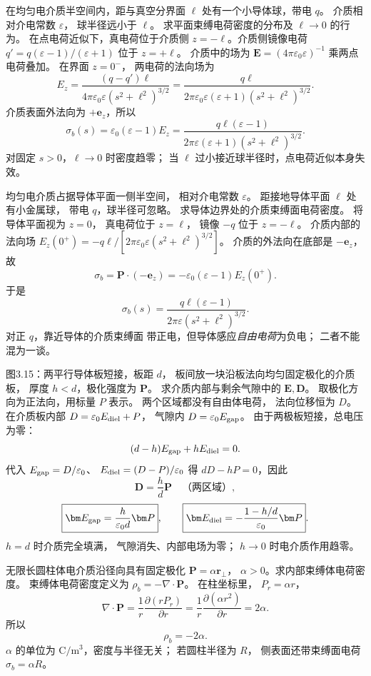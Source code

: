 在均匀电介质半空间内，距与真空分界面
$\ell$ 处有一个小导体球，带电 $q$。
介质相对介电常数 $\varepsilon$，
球半径远小于 $\ell$。
求平面束缚电荷密度的分布及 $\ell\to0$ 的行为。
\exsolution
在点电荷近似下，真电荷位于介质侧
$z=-\ell$。介质侧镜像电荷
$q'=q(\varepsilon-1)/(\varepsilon+1)$
位于 $z=+\ell$。
介质中的场为
$\bm E=(4\pi\varepsilon_0\varepsilon)^{-1}$
乘两点电荷叠加。
在界面 $z=0^-$，
两电荷的法向场为
\[
E_z=\frac{(q-q')\ell}
{4\pi\varepsilon_0\varepsilon(s^2+\ell^2)^{3/2}}
=\frac{q\ell}
{2\pi\varepsilon_0\varepsilon(\varepsilon+1)
(s^2+\ell^2)^{3/2}}.
\]
介质表面外法向为 $+\bm e_z$，所以
\[
\boxed{\sigma_b(s)=
\varepsilon_0(\varepsilon-1)E_z
=\frac{q\ell(\varepsilon-1)}
{2\pi\varepsilon(\varepsilon+1)
(s^2+\ell^2)^{3/2}}}.
\]
\excheck 对固定 $s>0$，$\ell\to0$ 时密度趋零；
当 $\ell$ 过小接近球半径时，点电荷近似本身失效。

均匀电介质占据导体平面一侧半空间，
相对介电常数 $\varepsilon$。
距接地导体平面 $\ell$ 处有小金属球，
带电 $q$，球半径可忽略。
求导体边界处的介质束缚面电荷密度。
\exsolution
将导体平面视为 $z=0$，
真电荷位于 $z=\ell$，
镜像 $-q$ 位于 $z=-\ell$。
介质内部的法向场
$E_z(0^+)=-q\ell/
[2\pi\varepsilon_0\varepsilon(s^2+\ell^2)^{3/2}]$。
介质的外法向在底部是 $-\bm e_z$，
故
\[
\sigma_b=\bm P\cdot(-\bm e_z)
=-\varepsilon_0(\varepsilon-1)E_z(0^+).
\]
于是
\[
\boxed{\sigma_b(s)=
\frac{q\ell(\varepsilon-1)}
{2\pi\varepsilon(s^2+\ell^2)^{3/2}}}.
\]
\excheck 对正 $q$，靠近导体的介质束缚面
带正电，但导体感应\emph{自由电荷}为负电；
二者不能混为一谈。

图3.15：两平行导体板短接，板距 $d$，
板间放一块沿板法向均匀固定极化的介质板，
厚度 $h<d$，极化强度为 $\bm P$。
求介质内部与剩余气隙中的 $\bm E,\bm D$。
\exsolution
取极化方向为正法向，用标量 $P$ 表示。
两个区域都没有自由体电荷，
法向位移恒为 $D$。
在介质板内部
$D=\varepsilon_0E_{\rm diel}+P$，
气隙内
$D=\varepsilon_0E_{\rm gap}$。
由于两极板短接，总电压为零：
\[
(d-h)E_{\rm gap}+hE_{\rm diel}=0.
\]
代入 $E_{\rm gap}=D/\varepsilon_0$、
$E_{\rm diel}=(D-P)/\varepsilon_0$ 得
$dD-hP=0$，因此
\[
\boxed{\bm D=\frac hd\bm P
\quad\text{（两区域）}},
\]
\[
\boxed{\bm E_{\rm gap}=\frac{h}{\varepsilon_0d}\bm P},
\qquad
\boxed{\bm E_{\rm diel}=
-\frac{1-h/d}{\varepsilon_0}\bm P}.
\]
\excheck $h=d$ 时介质完全填满，
气隙消失、内部电场为零；
$h\to0$ 时电介质作用趋零。

无限长圆柱体电介质沿径向具有固定极化
$\bm P=\alpha\bm r_\perp$，
$\alpha>0$。求内部束缚体电荷密度。
\exsolution
束缚体电荷密度定义为
$\rho_b=-\nabla\cdot\bm P$。
在柱坐标里，
$P_r=\alpha r$，
\[
\nabla\cdot\bm P=
\frac1r\frac{\partial(rP_r)}{\partial r}
=\frac1r\frac{\partial(\alpha r^2)}{\partial r}
=2\alpha.
\]
所以
\[
\boxed{\rho_b=-2\alpha}.
\]
\excheck $\alpha$ 的单位为
$\mathrm{C/m^3}$，密度与半径无关；
若圆柱半径为 $R$，
侧表面还带束缚面电荷
$\sigma_b=\alpha R$。

